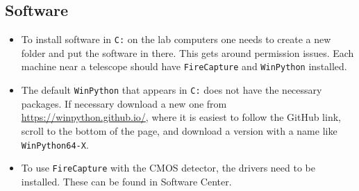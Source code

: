 \documentclass[11pt]{article}
\begin{document}
\subsection{Software}

\begin{itemize}
    \item To install software in \texttt{C:} on the lab computers one needs to create a new folder and put the software in there. This gets around permission issues. Each machine near a telescope should have \texttt{FireCapture} and \texttt{WinPython} installed.

    \item The default \texttt{WinPython} that appears in \texttt{C:} does not have the necessary packages. If necessary download a new one from \href{https://winpython.github.io/}{https://winpython.github.io/}, where it is easiest to follow the GitHub link, scroll to the bottom of the page, and download a version with a name like \texttt{WinPython64-X}.

    \item To use \texttt{FireCapture} with the CMOS detector, the drivers need to be installed. These can be found in Software Center.
\end{itemize}

\clearpage



\end{document}
